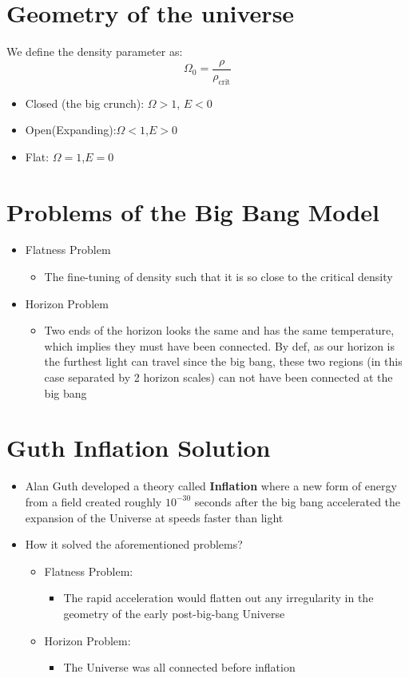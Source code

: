 \documentclass{article}
\begin{document}
\section{Geometry of the universe}
We define the density parameter as:
\begin{equation}
    \Omega_0=\frac{\rho}{\rho_\text{crit}}
\end{equation}
\begin{itemize}
    \item Closed (the big crunch): $\Omega>1$, $E<0$
    \item Open(Expanding):$\Omega<1$,$E>0$
    \item Flat: $\Omega=1$,$E=0$
\end{itemize}
\section{Problems of the Big Bang Model}
\begin{itemize}
    \item Flatness Problem
    \begin{itemize}
        \item The fine-tuning of density such that it is so close to the critical density
    \end{itemize}
    \item Horizon Problem
    \begin{itemize}
    \item Two ends of the horizon looks the same and has the same temperature, which implies they must have been connected. By def, as our horizon is the furthest light can travel since the big bang, these two regions (in this case separated by 2 horizon scales) can not have been connected at the big bang
\end{itemize}
\end{itemize}
\section{Guth Inflation Solution}
\begin{itemize}
    \item Alan Guth developed a theory called \textbf{Inflation} where a new form of energy from a field created roughly $10^{-30}$ seconds after the big bang accelerated the
expansion of the Universe at speeds faster than light 
    \item How it solved the aforementioned problems?
    \begin{itemize}
        \item Flatness Problem:
        \begin{itemize}
            \item  The rapid acceleration would flatten out any irregularity in the geometry of the early post-big-bang Universe
        \end{itemize}
        \item Horizon Problem:
        \begin{itemize}
            \item The Universe was all connected before inflation
        \end{itemize}
    \end{itemize}
\end{itemize}
\end{document}
